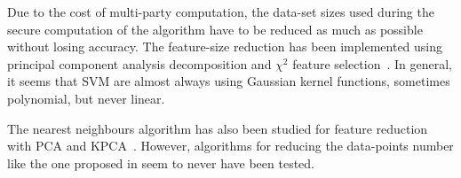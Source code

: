 Due to the cost of multi-party computation, the data-set sizes used during the secure computation of the algorithm have to be reduced as much as possible without losing accuracy. The feature-size reduction has been implemented using principal component analysis decomposition and $\chi^2$ feature selection~\cite{Eid2010PrincipleSystem,Ikram2016ImprovingSVM,SumaiyaThaseen2017IntrusionSVM,Yang:1997:CSF:645526.657137}. In general, it seems that SVM are almost always using Gaussian kernel functions, sometimes polynomial, but never linear.

The nearest neighbours algorithm has also been studied for feature reduction with PCA and KPCA~\cite{Elkhadir2016IntrusionMethods}. However, algorithms for reducing the data-points number like the one proposed in \cite{Angiulli2005FastRule} seem to never have been tested.







